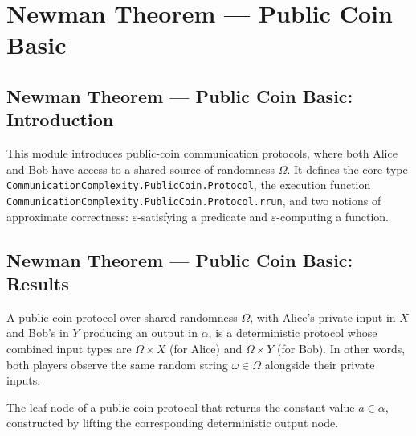 \section{Newman Theorem --- Public Coin Basic}
\subsection*{Newman Theorem --- Public Coin Basic: Introduction}

This module introduces public-coin communication protocols, where both Alice and Bob
have access to a shared source of randomness $\Omega$.  It defines the core type
\texttt{CommunicationComplexity.PublicCoin.Protocol}, the execution function
\texttt{CommunicationComplexity.PublicCoin.Protocol.rrun}, and two notions of approximate
correctness: $\varepsilon$-satisfying a predicate and $\varepsilon$-computing a function.

\subsection*{Newman Theorem --- Public Coin Basic: Results}

\begin{definition}
\label{CommunicationComplexity.PublicCoin.Protocol}
\leanok
{}
A public-coin protocol over shared randomness $\Omega$, with Alice's private input
in $X$ and Bob's in $Y$ producing an output in $\alpha$, is a deterministic protocol
whose combined input types are $\Omega \times X$ (for Alice) and $\Omega \times Y$
(for Bob).  In other words, both players observe the same random string $\omega \in \Omega$
alongside their private inputs.
\end{definition}

\begin{definition}
\label{CommunicationComplexity.PublicCoin.Protocol.output}
\leanok
{}
The leaf node of a public-coin protocol that returns the constant value $a \in \alpha$,
constructed by lifting the corresponding deterministic output node.
\end{definition}

